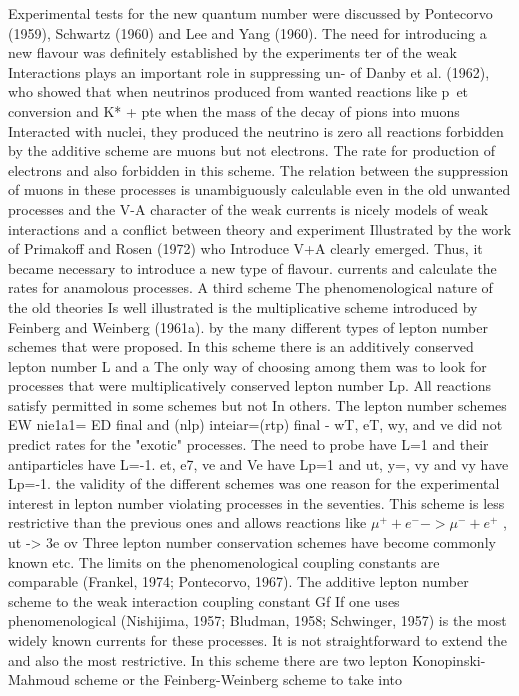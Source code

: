 \documentclass[twoside]{article}
\begin{document}
Experimental tests for the new quantum number were discussed by 
Pontecorvo (1959), Schwartz (1960) and Lee and Yang (1960). The need for 
introducing a new flavour was definitely established by the experiments ter of the weak Interactions plays an important role in suppressing un-
of Danby et al. (1962), who showed that when neutrinos produced from wanted reactions like p~et conversion and K* + pte
when the mass of
the decay of pions into muons Interacted with nuclei, they produced the neutrino is zero all reactions forbidden by the additive scheme are
muons but not electrons. The rate for production of electrons and also forbidden in this scheme. The relation between the suppression of
muons in these processes is unambiguously calculable even in the old unwanted processes and the V-A character of the weak currents is nicely
models of weak interactions and a conflict between theory and experiment Illustrated by the work of Primakoff and Rosen (1972) who Introduce V+A
clearly emerged. Thus, it became necessary to introduce a new type of flavour. currents and calculate the rates for anamolous processes. A third scheme
The phenomenological nature of the old theories Is well illustrated is the multiplicative scheme introduced by Feinberg and Weinberg (1961a).
by the many different types of lepton number schemes that were proposed. In this scheme there is an additively conserved lepton number L and a
The only way of choosing among them was to look for processes that were multiplicatively conserved lepton number Lp. All reactions satisfy
permitted in some schemes but not In others. The lepton number schemes EW nie1a1= ED final and (nlp) inteiar=(rtp) final - wT, eT, wy, and ve
did not predict rates for the "exotic" processes. The need to probe
have L=1 and their antiparticles have L=-1. et, e7, ve and Ve have Lp=1 and ut, y=, vy and vy have Lp=-1.
the validity of the different schemes was one reason for the experimental interest in lepton number violating processes in the seventies.  This scheme is less restrictive than
 the previous ones and allows reactions like $\mu^{+}+e^{-} -> \mu^{-}+e^{+}$ , ut -> 3e ov
Three lepton number conservation schemes have become commonly known etc. The limits on the phenomenological coupling constants are comparable
(Frankel, 1974; Pontecorvo, 1967). The additive lepton number scheme to the weak interaction coupling constant Gf If one uses phenomenological
(Nishijima, 1957; Bludman, 1958; Schwinger, 1957) is the most widely known currents for these processes. It is not straightforward to extend the
and also the most restrictive. In this scheme there are two lepton Konopinski-Mahmoud scheme or the Feinberg-Weinberg scheme to take into
\end{document}
